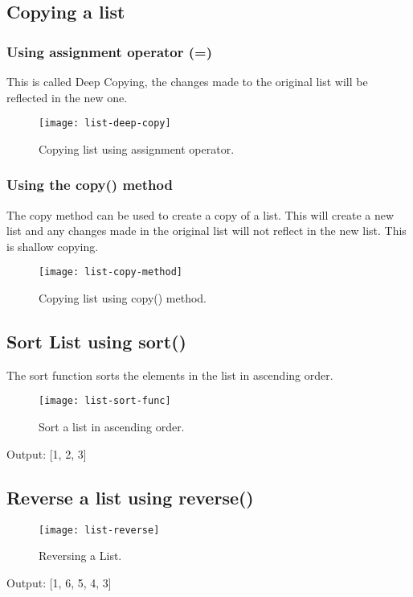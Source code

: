 \subsection{Copying a list}
\subsubsection{Using assignment operator (=)}
{\large This is called Deep Copying, the changes made to the original list will be reflected in the new one.}
\newpage

\begin{figure}[h]
	\centering
	\texttt{[image: list-deep-copy]}
	\caption{Copying list using assignment operator.}
	\label{fig:list-deep-copy}
\end{figure}

\subsubsection{Using the copy() method}
{\large The copy method can be used to create a copy of a list. This will create a new list and any changes made in the original list will not reflect in the new list. This is shallow copying.}
\newpage

\begin{figure}[h]
	\centering
	\texttt{[image: list-copy-method]}
	\caption{Copying list using copy() method.}
	\label{fig:list-shallow-copy}
\end{figure}

\subsection{Sort List using sort()}
The sort function sorts the elements in the list in ascending order.

\begin{figure}[h]
	\centering
	\texttt{[image: list-sort-func]}
	\caption{Sort a list in ascending order.}
	\label{fig:list-sort-func}
\end{figure}

Output: [1, 2, 3]

\subsection{Reverse a list using reverse()}
\newpage

\begin{figure}[h]
	\centering
	\texttt{[image: list-reverse]}
	\caption{Reversing a List.}
	\label{fig:list-reverse}
\end{figure}

Output: [1, 6, 5, 4, 3]